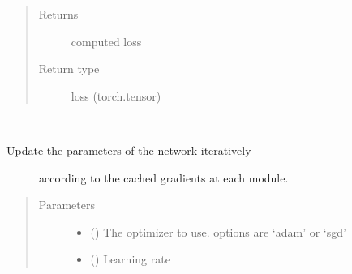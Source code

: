 \documentclass[letterpaper,10pt,english,openany,oneside]{sphinxmanual}
\begin{document}
\begin{fulllineitems}
\begin{fulllineitems}
\begin{quote}
\begin{description}
\begin{itemize}
\end{itemize}

\item[{Returns}] \leavevmode
computed loss

\item[{Return type}] \leavevmode
loss (torch.tensor)

\end{description}\end{quote}

\end{fulllineitems}


\begin{fulllineitems}
\label{\detokenize{nn:nn.sequential.Sequential.update_params}}~\begin{description}
\item[{Update the parameters of the network iteratively}] \leavevmode
according to the cached gradients at each module.

\end{description}
\begin{quote}\begin{description}
\item[{Parameters}] \leavevmode\begin{itemize}
\item {} 
 () \textendash{} The optimizer to use. options are ‘adam’ or ‘sgd’

\item {} 
 () \textendash{} Learning rate

\end{itemize}

\end{description}\end{quote}

\end{fulllineitems}



\end{fulllineitems}
\end{document}
